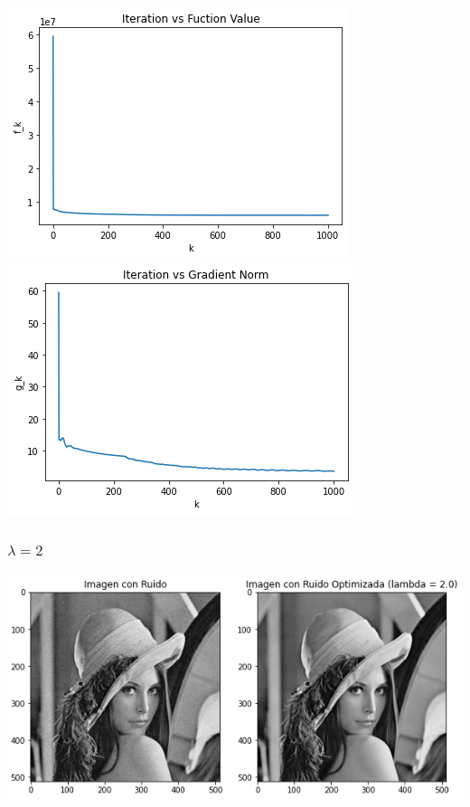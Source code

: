 \documentclass[11pt,letterpaper]{article}
\theoremstyle{definition}
\theoremstyle{definition}
\theoremstyle{definition}
\begin{document}
\begin{center}
	\includegraphics[width=0.6\linewidth]{graficas/fr/funcion_1}
	\includegraphics[width=0.6\linewidth]{graficas/fr/gradiente_1}
\end{center}

\subsubsection{$ \lambda = 2 $}
\begin{center}
	\includegraphics[width=0.7\linewidth]{graficas/fr/optimizada_2}
\end{center}
\end{document}
